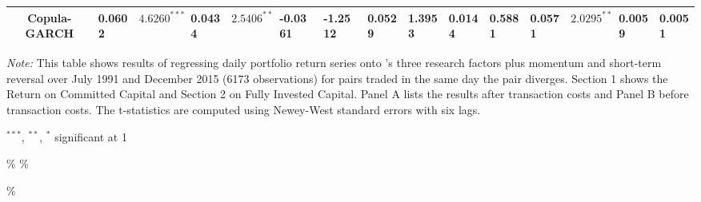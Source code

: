 \documentclass[a4paper]{article}
\begin{document}
\begin{sidewaystable}
\begin{threeparttable}[H]
\begin{tabularx}{\textwidth}{@{\extracolsep{\fill}}lllllllllllllll@{}}
				\multicolumn{1}{c}{Copula-GARCH} & 0.0602 & $4.6260^{***}$ & 0.0434 & $2.5406^{**}$ & -0.0361 & -1.2512 & 0.0529 & 1.3953 & 0.0144 & 0.5881 & 0.0571 & $2.0295^{**}$ & 0.0059 & 0.0051\\
				\bottomrule
			\end{tabularx}
			\begin{tablenotes}
				\item \textit{Note:} \scriptsize  This table shows results of regressing daily portfolio return series onto \citet*{ff93}'s three research factors plus momentum and short-term reversal over July 1991 and December 2015 (6173 observations) for pairs traded in the same day the pair diverges. Section 1 shows the Return on Committed Capital and Section 2 on Fully Invested Capital. Panel A lists the results after transaction costs and Panel B before transaction costs. The t-statistics are computed using Newey-West standard errors with six lags.
				\item \scriptsize $^{\ast\ast\ast}$, $^{\ast\ast}$, $^{\ast}$  significant at 1\\%
			\end{tablenotes}
		\end{threeparttable}\%
		\label{tab:table108}\%
	\end{sidewaystable}\%
	
\end{document}
